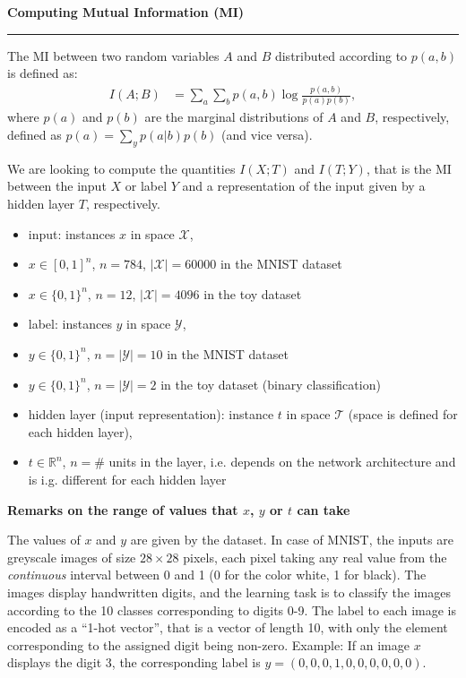 \documentclass[12pt]{report}
\author{Anna Golubeva}
\begin{document}
\begin{center}
{\bf\Large{Computing Mutual Information (MI)}}\\
\end{center}
\noindent\rule{\textwidth}{0.4pt}

The MI between two random variables $A$ and $B$ distributed according to $p(a,b)$ is defined as:
\begin{align}
I(A;B) &= \sum \limits_{a} \sum \limits_{b} p(a,b) \log\frac{p(a,b)}{p(a)p(b)},
\end{align}
where $p(a)$ and $p(b)$ are the marginal distributions of $A$ and $B$, respectively, defined as $p(a) = \sum_y p(a|b)p(b)$ (and vice versa).

We are looking to compute the quantities $I(X;T)$ and $I(T;Y)$, that is the MI between the input $X$ or label $Y$ and a representation of the input given by a hidden layer $T$, respectively.
\begin{itemize}
\item input: instances $x$ in space $\mathcal{X}$,
\item[] $x\in [0,1]^n$, $n=784$, $|\mathcal{X}| = 60000$ in the MNIST dataset
\item[] $x\in \{0,1\}^n$, $n=12$, $|\mathcal{X}| = 4096$ in the toy dataset
\item label: instances $y$ in space $\mathcal{Y}$,
\item[] $y\in \{0,1\}^n$, $n = |\mathcal{Y}| = 10$ in the MNIST dataset
\item[] $y\in \{0,1\}^n$, $n= |\mathcal{Y}| = 2$ in the toy dataset (binary classification)
\item hidden layer (input representation): instance $t$ in space $\mathcal{T}$ (space is defined for each hidden layer),
\item[] $t\in\mathbb{R}^n$, $n=\#$ units in the layer, i.e. depends on the network architecture and is i.g. different for each hidden layer
\end{itemize}

\vspace{1cm}
{\bf Remarks on the range of values that $x$, $y$ or $t$ can take}

The values of $x$ and $y$ are given by the dataset. In case of MNIST, the inputs are greyscale images of size $28\times 28$ pixels, each pixel taking any real value from the {\it continuous} interval between 0 and 1 (0 for the color white, 1 for black). The images display handwritten digits, and the learning task is to classify the images according to the 10 classes corresponding to digits 0-9. The label to each image is encoded as a ``1-hot vector'', that is a vector of length 10, with only the element corresponding to the assigned digit being non-zero. Example: If an image $x$ displays the digit 3, the corresponding label is $y = (0,0,0,1,0,0,0,0,0,0)$.
\end{document}
